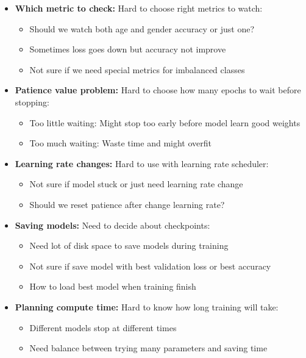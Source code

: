 \documentclass{article}
\begin{document}
\begin{itemize}
    \item \textbf{Which metric to check:} Hard to choose right metrics to watch:
    \begin{itemize}
        \item Should we watch both age and gender accuracy or just one?
        \item Sometimes loss goes down but accuracy not improve
        \item Not sure if we need special metrics for imbalanced classes
    \end{itemize}

    \item \textbf{Patience value problem:} Hard to choose how many epochs to wait before stopping:
    \begin{itemize}
        \item Too little waiting: Might stop too early before model learn good weights
        \item Too much waiting: Waste time and might overfit
    \end{itemize}

    \item \textbf{Learning rate changes:} Hard to use with learning rate scheduler:
    \begin{itemize}
        \item Not sure if model stuck or just need learning rate change
        \item Should we reset patience after change learning rate?
    \end{itemize}

    \item \textbf{Saving models:} Need to decide about checkpoints:
    \begin{itemize}
        \item Need lot of disk space to save models during training
        \item Not sure if save model with best validation loss or best accuracy
        \item How to load best model when training finish
    \end{itemize}

    \item \textbf{Planning compute time:} Hard to know how long training will take:
    \begin{itemize}
        \item Different models stop at different times
        \item Need balance between trying many parameters and saving time
    \end{itemize}
\end{itemize}
\end{document}
